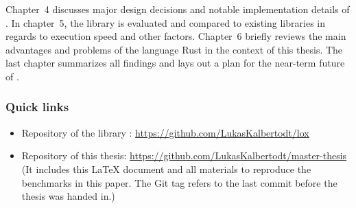 Chapter~4 discusses major design decisions and notable implementation details of .
In chapter~5, the library is evaluated and compared to existing libraries in regards to execution speed and other factors.
Chapter~6 briefly reviews the main advantages and problems of the language Rust in the context of this thesis.
The last chapter summarizes all findings and lays out a plan for the near-term future of .


\vfill

\subsubsection*{Quick links}
\begin{itemize}
  \item Repository of the library : \textcolor{link-blue}{\url{https://github.com/LukasKalbertodt/lox}}
  \item Repository of this thesis: \textcolor{link-blue}{\url{https://github.com/LukasKalbertodt/master-thesis}}\\
  {\footnotesize (It includes this \LaTeX{} document and all materials to reproduce the benchmarks in this paper.
  The Git tag  refers to the last commit before the thesis was handed in.)}
\end{itemize}

\vspace{2cm}


